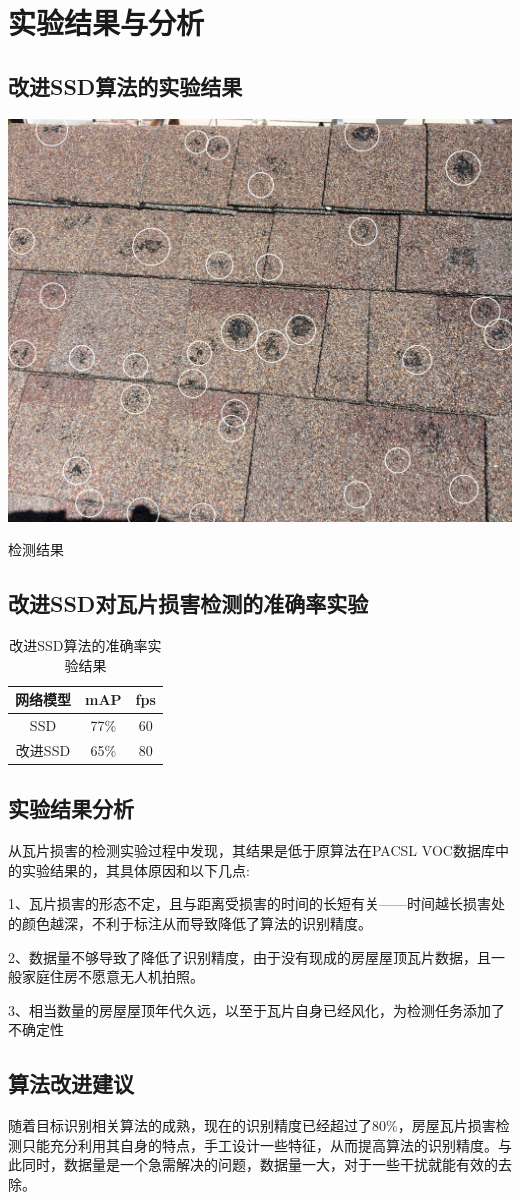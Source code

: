 \section{实验结果与分析}
\setcounter{figure}{0}

\subsection{改进SSD算法的实验结果}
\begin{uscfigure}
	\includegraphics[width=\textwidth]{./Pictures/result.jpg}	
	\caption{检测结果}
	\label{result}
\end{uscfigure}
\subsection{改进SSD对瓦片损害检测的准确率实验}
\begin{table}[htbp]
	\centering
	\caption{改进SSD算法的准确率实验结果}
	\label{}
	\begin{tabular}{ccc}
		\toprule
		网络模型 & mAP & fps\\
		\midrule
		SSD 	& 77\% & 60\\
		改进SSD  &  65\% & 80\\
		\bottomrule
	\end{tabular}
\end{table}
\subsection{实验结果分析}
从瓦片损害的检测实验过程中发现，其结果是低于原算法在PACSL VOC数据库中的实验结果的，其具体原因和以下几点:

1、瓦片损害的形态不定，且与距离受损害的时间的长短有关——时间越长损害处的颜色越深，不利于标注从而导致降低了算法的识别精度。

2、数据量不够导致了降低了识别精度，由于没有现成的房屋屋顶瓦片数据，且一般家庭住房不愿意无人机拍照。

3、相当数量的房屋屋顶年代久远，以至于瓦片自身已经风化，为检测任务添加了不确定性

\subsection{算法改进建议}
随着目标识别相关算法的成熟，现在的识别精度已经超过了80\%，房屋瓦片损害检测只能充分利用其自身的特点，手工设计一些特征，从而提高算法的识别精度。与此同时，数据量是一个急需解决的问题，数据量一大，对于一些干扰就能有效的去除。
